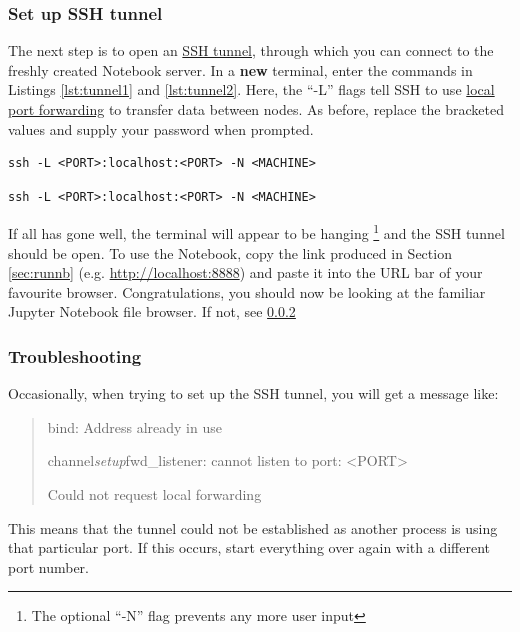 \documentclass[a4paper]{article}
\begin{document}
\subsubsection{Set up SSH tunnel}
\label{sec:tunnel}
The next step is to open an \href{http://blog.trackets.com/2014/05/17/ssh-tunnel-local-and-remote-port-forwarding-explained-with-examples.html}{SSH tunnel}, through which you can connect to the freshly created Notebook server.
In a \textbf{new} terminal, enter the commands in Listings \ref{lst:tunnel1} and \ref{lst:tunnel2}.
Here, the ``-L'' flags tell SSH to use \href{https://help.ubuntu.com/community/SSH/OpenSSH/PortForwarding}{local port forwarding} to transfer data between nodes. 
As before, replace the bracketed values and supply your password when prompted.

\begin{lstlisting}[caption={Tunnel to gateway server}, label={lst:tunnel1}]
ssh -L <PORT>:localhost:<PORT> -N <MACHINE>
\end{lstlisting}

\begin{lstlisting}[caption={Tunnel to machine}, label={lst:tunnel2}]
ssh -L <PORT>:localhost:<PORT> -N <MACHINE>
\end{lstlisting}

If all has gone well, the terminal will appear to be hanging \footnote{The optional ``-N'' flag prevents any more user input} and the SSH tunnel should be open.
To use the Notebook, copy the link produced in Section \ref{sec:runnb} (e.g. \url{http://localhost:8888}) and paste it into the URL bar of your favourite browser. 
Congratulations, you should now be looking at the familiar Jupyter Notebook file browser. If not, see \ref{sec:trouble} 

\subsubsection{Troubleshooting}
\label{sec:trouble}
Occasionally, when trying to set up the SSH tunnel, you will get a message like:
\begin{quote}
bind: Address already in use

channel\emph{setup}fwd\_listener: cannot listen to port: \textless{}PORT\textgreater{}

Could not request local forwarding
\end{quote}

This means that the tunnel could not be established as another process is using that particular port.
If this occurs, start everything over again with a different port number.
\end{document}
